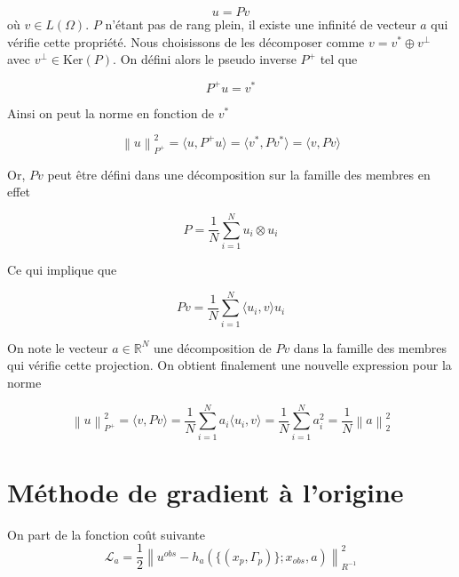 \documentclass{article}
\newcommand{\norm}[1]{\left\lVert #1 \right\rVert}
\begin{document}
\begin{equation*}
    u = P v
\end{equation*} où $v \in L(\Omega)$. $P$ n'étant pas de rang plein, il existe une infinité de vecteur $a$ qui vérifie cette propriété. Nous choisissons de les décomposer comme $v = v^* \oplus v^\perp$ avec $v^\perp \in \text{Ker}(P)$. On défini alors le pseudo inverse $P^+$ tel que

\begin{equation*}
    P^+ u = v^*
\end{equation*}

Ainsi on peut la norme en fonction de $v^*$

\begin{equation*}
    \norm{u}^2_{P^+} = \langle u, P^+ u \rangle = \langle v^*, P v^* \rangle = \langle v, P v \rangle
\end{equation*}

Or, $P v$ peut être défini dans une décomposition sur la famille des membres en effet

\begin{equation*}
    P = \frac1N \sum_{i=1}^N u_i \otimes u_i
\end{equation*}

Ce qui implique que

\begin{equation*}
    P v = \frac1N \sum_{i=1}^N \langle u_i, v \rangle u_i
\end{equation*}

On note le vecteur $a \in \mathbb{R}^N$ une décomposition de $Pv$ dans la famille des membres qui vérifie cette projection. On obtient finalement une nouvelle expression pour la norme

\begin{equation}
    \norm{u}^2_{P^+} = \langle v, P v \rangle = \frac1N \sum_{i=1}^N a_i \langle u_i, v\rangle = \frac1N \sum_{i=1}^N a_i^2 = \frac1N \norm{a}^2_2
\end{equation}


\section{Méthode de gradient à l'origine}

On part de la fonction coût suivante
\begin{equation*}
    \mathcal L_a =  \frac12 \norm{u^{obs} - h_a(\{(x_p, \Gamma_p)\}; x_{obs}, a)}^2_{R^{-1}}
\end{equation*}
\end{document}
